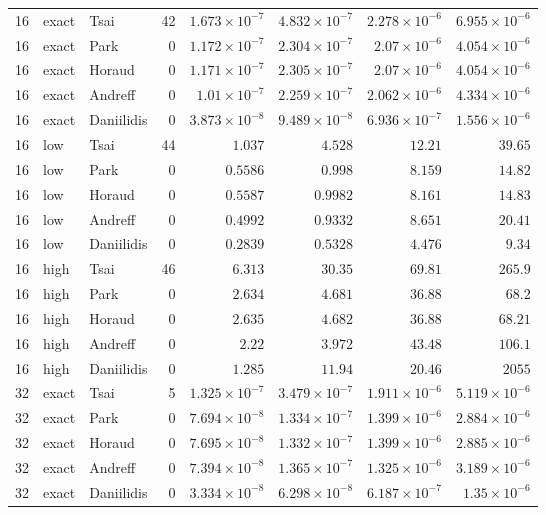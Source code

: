 \begin{longtable}{rllrrrrr}
16 & exact & Tsai & 42 & $1.673\times10^{-7}$ & $4.832\times10^{-7}$ & $2.278\times10^{-6}$ & $6.955\times10^{-6}$ \\
16 & exact & Park & 0 & $1.172\times10^{-7}$ & $2.304\times10^{-7}$ & $2.07\times10^{-6}$ & $4.054\times10^{-6}$ \\
16 & exact & Horaud & 0 & $1.171\times10^{-7}$ & $2.305\times10^{-7}$ & $2.07\times10^{-6}$ & $4.054\times10^{-6}$ \\
16 & exact & Andreff & 0 & $1.01\times10^{-7}$ & $2.259\times10^{-7}$ & $2.062\times10^{-6}$ & $4.334\times10^{-6}$ \\
16 & exact & Daniilidis & 0 & $3.873\times10^{-8}$ & $9.489\times10^{-8}$ & $6.936\times10^{-7}$ & $1.556\times10^{-6}$ \\
16 & low & Tsai & 44 & $1.037$ & $4.528$ & $12.21$ & $39.65$ \\
16 & low & Park & 0 & $0.5586$ & $0.998$ & $8.159$ & $14.82$ \\
16 & low & Horaud & 0 & $0.5587$ & $0.9982$ & $8.161$ & $14.83$ \\
16 & low & Andreff & 0 & $0.4992$ & $0.9332$ & $8.651$ & $20.41$ \\
16 & low & Daniilidis & 0 & $0.2839$ & $0.5328$ & $4.476$ & $9.34$ \\
16 & high & Tsai & 46 & $6.313$ & $30.35$ & $69.81$ & $265.9$ \\
16 & high & Park & 0 & $2.634$ & $4.681$ & $36.88$ & $68.2$ \\
16 & high & Horaud & 0 & $2.635$ & $4.682$ & $36.88$ & $68.21$ \\
16 & high & Andreff & 0 & $2.22$ & $3.972$ & $43.48$ & $106.1$ \\
16 & high & Daniilidis & 0 & $1.285$ & $11.94$ & $20.46$ & $2055$ \\
32 & exact & Tsai & 5 & $1.325\times10^{-7}$ & $3.479\times10^{-7}$ & $1.911\times10^{-6}$ & $5.119\times10^{-6}$ \\
32 & exact & Park & 0 & $7.694\times10^{-8}$ & $1.334\times10^{-7}$ & $1.399\times10^{-6}$ & $2.884\times10^{-6}$ \\
32 & exact & Horaud & 0 & $7.695\times10^{-8}$ & $1.332\times10^{-7}$ & $1.399\times10^{-6}$ & $2.885\times10^{-6}$ \\
32 & exact & Andreff & 0 & $7.394\times10^{-8}$ & $1.365\times10^{-7}$ & $1.325\times10^{-6}$ & $3.189\times10^{-6}$ \\
32 & exact & Daniilidis & 0 & $3.334\times10^{-8}$ & $6.298\times10^{-8}$ & $6.187\times10^{-7}$ & $1.35\times10^{-6}$ \\

\end{longtable}
